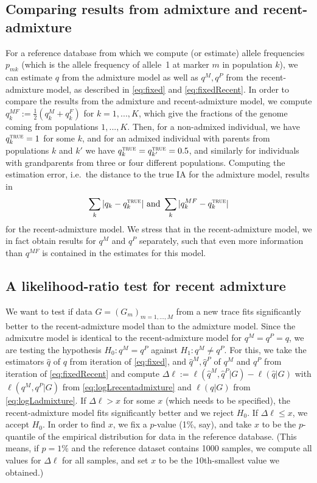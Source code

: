 \documentclass[12pt]{article}
\theoremstyle{definition}
\begin{document}
\subsection{Comparing results from admixture and recent-admixture}
For a reference database from which we compute (or estimate) allele
frequencies $p_{mk}$ (which is the allele frequency of allele~1 at
marker $m$ in population $k$), we can estimate $q$ from the admixture
model as well as $q^M,q^P$ from the recent-admixture model, as
described in \eqref{eq:fixed} and \eqref{eq:fixedRecent}. In order to
compare the results from the admixture and recent-admixture model, we
compute $q_k^{MF} := \tfrac 12 (q_k^M + q_k^F)$ for $k=1,...,K$, which
give the fractions of the genome coming from populations
$1,...,K$. Then, for a non-admixed individual, we have
$q_k^{\text{\sc true}} = 1$ for some $k$, and for an admixed
individual with parents from populations $k$ and $k'$ we have
$q_k^{\text{\sc true}} =q_{k'}^{\text{\sc true}} = 0.5$, and similarly
for individuals with grandparents from three or four different
populations. Computing the estimation error, i.e.\ the distance to the
true IA for the admixture model, results in
\begin{align}
  \label{eq:error}
  \sum_k |q_k - q_k^{\text{\sc true}}| \text{  and }\sum_k |q_k^{MF} - q_k^{\text{\sc true}}|
\end{align}
for the recent-admixture model. We stress that in the recent-admixture
model, we in fact obtain results for $q^M$ and $q^P$ separately, such
that even more information than $q^{MF}$ is contained in the estimates
for this model.

\subsection{A likelihood-ratio test for recent admixture}
We want to test if data $G = (G_m)_{m=1,...,M}$ from a new trace fits
significantly better to the recent-admixture model than to the
admixture model. Since the admixutre model is identical to the
recent-admixture model for $q^M = q^P = q$, we are testing the
hypothesis $H_0: q^M = q^P$ against $H_1: q^M\neq q^P$. For this, we
take the estimators $\hat q$ of $q$ from iteration of
\eqref{eq:fixed}, and $\hat q^M, \hat q^P$ of $q^M$ and $q^P$ from
iteration of \eqref{eq:fixedRecent} and compute
$\Delta\ell := \ell(\hat q^M, \hat q^P|G) - \ell(\hat q|G)$ with
$\ell(q^M, q^P|G)$ from \eqref{eq:logLrecentadmixture} and $\ell(q|G)$
from \eqref{eq:logLadmixture}. If $\Delta \ell >x$ for some $x$ (which
needs to be specified), the recent-admixture model fits significantly
better and we reject $H_0$. If $\Delta \ell \leq x$, we accept
$H_0$. In order to find $x$, we fix a $p$-value (1\%, say), and take
$x$ to be the $p$-quantile of the empirical distribution for data in
the reference database. (This means, if $p=1\%$ and the reference
dataset contains 1000 samples, we compute all values for $\Delta\ell$
for all samples, and set $x$ to be the 10th-smallest value we
obtained.)
\end{document}

